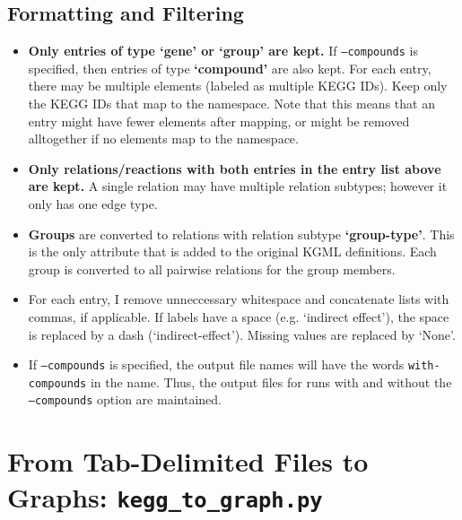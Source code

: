 \documentclass[10pt]{article}
\newcommand{\keggtograph}{\texttt{kegg\_to\_graph.py} }
\begin{document}
\subsection{Formatting and Filtering}

\begin{itemize}
\item \textbf{Only entries of type `gene' or `group' are kept.}  If \texttt{--compounds} is specified, then entries of type \textbf{`compound'} are also kept. For each entry, there may be multiple elements (labeled as multiple KEGG IDs).  Keep only the KEGG IDs that map to the namespace.  Note that this means that an entry might have fewer elements after mapping, or might be removed alltogether if no elements map to the namespace.
\item \textbf{Only relations/reactions with both entries in the entry list above are kept.}  A single relation may have multiple relation subtypes; however it only has one edge type.
\item \textbf{Groups} are converted to relations with relation subtype \textbf{`group-type'}.  This is the only attribute that is added to the original KGML definitions.  Each group is converted to all pairwise relations for the group members.
\item For each entry, I remove unneccessary whitespace and concatenate lists
with commas, if applicable.  If labels have a space (e.g. `indirect effect'), the space is replaced by a dash (`indirect-effect'). Missing values are replaced by `None'.
\item If \texttt{--compounds} is specified, the output file names will have the words \texttt{with-compounds} in the name.  Thus, the output files for runs with and without the \texttt{--compounds} option are maintained.
\end{itemize}

\section{From Tab-Delimited Files to Graphs: \keggtograph}
\end{document}
